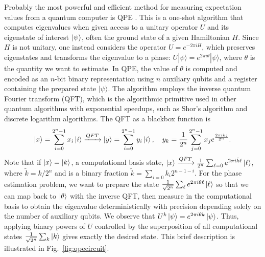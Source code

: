\documentclass[../main.tex]{subfiles}
\begin{document}
Probably the most powerful and efficient method for measuring expectation values from a quantum computer is \ac{QPE} \cite{kitaev1995quantum, nielsen2010quantum}. This is a one-shot algorithm that computes eigenvalues when given access to a unitary operator $U$ and its eigenstate of interest $\ket{\psi}$, often the ground state of a given Hamiltonian $H$. Since $H$ is not unitary, one instead considers the operator $U = e^{-2\pi iH}$, which preserves eigenstates and transforms the eigenvalue to a phase: $U|\psi\rangle = e^{2\pi i\theta}|\psi\rangle$, where $\theta$ is the quantity we want to estimate. In \ac{QPE}, the value of $\theta$ is computed and encoded as an $n$-bit binary representation using $n$ auxiliary qubits and a register containing the prepared state $|\psi\rangle$. The algorithm employs the inverse quantum Fourier transform (QFT), which is the algorithmic primitive used in other quantum algorithms with exponential speedups, such as Shor's algorithm and discrete logarithm algorithms. The \ac{QFT} as a blackbox function is
\begin{equation}
    \ket{x} = \sum_{i=0}^{2^n - 1} x_i \ket{i} \xrightarrow{QFT} \ket{y} = \sum_{i=0}^{2^n - 1} y_i \ket{i}, \quad y_k = \frac{1}{2^n} \sum_{j=0}^{2^n - 1} x_j e^{\frac{2 \pi i k j}{2^n}}.
\end{equation} 
Note that if $\ket{x} = \ket{k}$, a computational basis state, $ \ket{x} \xrightarrow{QFT} \frac{1}{2^n} \sum_{\ell = 0} e^{2 \pi i \tilde{k} \ell} \ket{\ell}$, where $\tilde{k} = k/2^{n}$ and is a binary fraction $\tilde{k} = \sum_{i=0} k_i 2^{n-1-i}$. For the phase estimation problem, we want to prepare the state $\frac{1}{\sqrt{2^n}} \sum_\ell e^{2 \pi i \theta \ell} \ket{\ell}$ so that we can map back to $\ket{\theta}$ with the inverse \ac{QFT}, then measure in the computational basis to obtain the eigenvalue deterministically with precision depending solely on the number of auxiliary qubits. We observe that  $U^k \ket{\psi} = e^{2 \pi i \theta k} \ket{\psi}$. Thus, applying binary powers of $U$ controlled by the superposition of all computational states  $\frac{1}{\sqrt{2^n}} \sum_k \ket{k}$ gives exactly the desired state. This brief description is illustrated in Fig.~\ref{fig:qpecircuit}.
\end{document}
